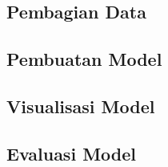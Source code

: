 \documentclass[ugmtesis]{ugmtesis}
\begin{document}
		\subsection{Pembagian Data}
		\label{implementasi pembagian data}
		

		\subsection{Pembuatan Model}
		\label{implementasi pembuatan model}
		

		\subsection{Visualisasi Model}
		\label{implementasi visualisasi model}
		


		\subsection{Evaluasi Model}
		\label{implementasi evaluasi model}
		




\end{document}
